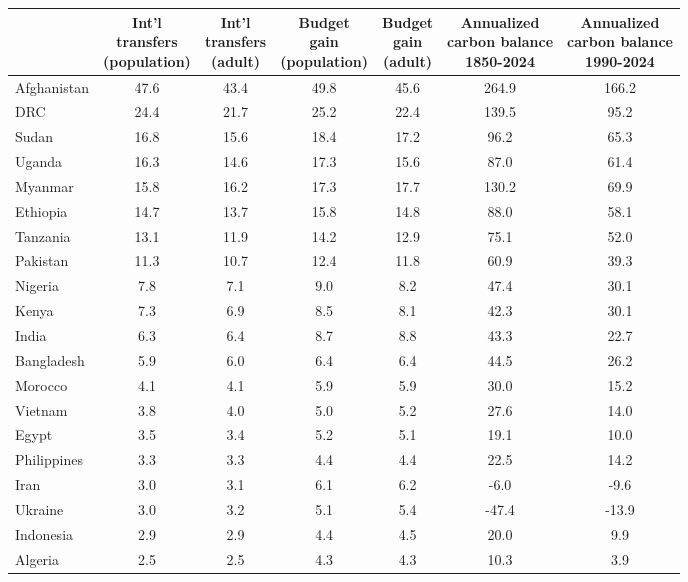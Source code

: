 
\begin{tabular}[t]{lcccccc}
\toprule
  & \makecell{Int'l\\transfers\\(population)} & \makecell{Int'l\\transfers\\(adult)} & \makecell{Budget\\gain\\(population)} & \makecell{Budget\\gain\\(adult)} & \makecell{Annualized\\carbon balance\\1850-2024} & \makecell{Annualized\\carbon balance\\1990-2024}\\
\midrule
Afghanistan & 47.6 & 43.4 & 49.8 & 45.6 & 264.9 & 166.2\\
DRC & 24.4 & 21.7 & 25.2 & 22.4 & 139.5 & 95.2\\
Sudan & 16.8 & 15.6 & 18.4 & 17.2 & 96.2 & 65.3\\
Uganda & 16.3 & 14.6 & 17.3 & 15.6 & 87.0 & 61.4\\
Myanmar & 15.8 & 16.2 & 17.3 & 17.7 & 130.2 & 69.9\\
Ethiopia & 14.7 & 13.7 & 15.8 & 14.8 & 88.0 & 58.1\\
Tanzania & 13.1 & 11.9 & 14.2 & 12.9 & 75.1 & 52.0\\
Pakistan & 11.3 & 10.7 & 12.4 & 11.8 & 60.9 & 39.3\\
Nigeria & 7.8 & 7.1 & 9.0 & 8.2 & 47.4 & 30.1\\
Kenya & 7.3 & 6.9 & 8.5 & 8.1 & 42.3 & 30.1\\
India & 6.3 & 6.4 & 8.7 & 8.8 & 43.3 & 22.7\\
Bangladesh & 5.9 & 6.0 & 6.4 & 6.4 & 44.5 & 26.2\\
Morocco & 4.1 & 4.1 & 5.9 & 5.9 & 30.0 & 15.2\\
Vietnam & 3.8 & 4.0 & 5.0 & 5.2 & 27.6 & 14.0\\
Egypt & 3.5 & 3.4 & 5.2 & 5.1 & 19.1 & 10.0\\
Philippines & 3.3 & 3.3 & 4.4 & 4.4 & 22.5 & 14.2\\
Iran & 3.0 & 3.1 & 6.1 & 6.2 & -6.0 & -9.6\\
Ukraine & 3.0 & 3.2 & 5.1 & 5.4 & -47.4 & -13.9\\
Indonesia & 2.9 & 2.9 & 4.4 & 4.5 & 20.0 & 9.9\\
Algeria & 2.5 & 2.5 & 4.3 & 4.3 & 10.3 & 3.9\\

\end{tabular}
